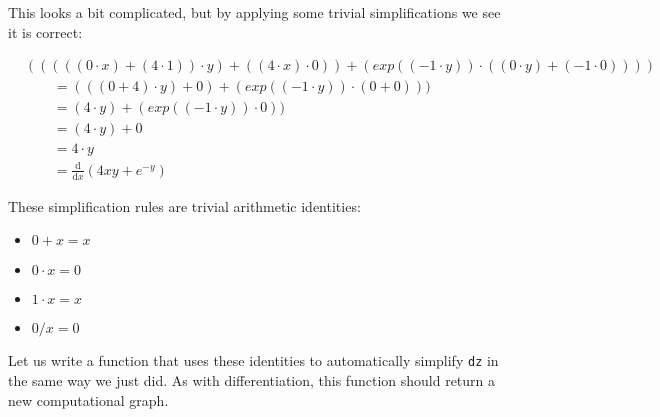 \documentclass[
  a4paper,
]{article}
\providecommand{\tightlist}{%
  \setlength{\itemsep}{0pt}\setlength{\parskip}{0pt}}
\begin{document}
This looks a bit complicated, but by applying some trivial
simplifications we see it is correct:

\begin{align*}
& ( ( ( ( ( 0 \cdot x ) + ( 4 \cdot 1 ) ) \cdot y ) + ( ( 4 \cdot x ) \cdot 0 ) ) + ( exp ( ( -1 \cdot y ) ) \cdot ( ( 0 \cdot y ) + ( -1 \cdot 0 ) ) ) )  \\
&\qquad= ( ( ( 0 + 4 ) \cdot y ) + 0 ) + ( exp ( ( -1 \cdot y ) ) \cdot ( 0 + 0 ) ) ) \\
&\qquad= ( 4 \cdot y ) + ( exp ( ( -1 \cdot y ) ) \cdot 0 ) ) \\
&\qquad= ( 4 \cdot y ) + 0 \\
&\qquad= 4 \cdot y \\
&\qquad= \frac{\text{d}}{\text{d}x} \left(4xy+e^{-y}\right)
\end{align*}

These simplification rules are trivial arithmetic identities:

\begin{itemize}
\tightlist
\item
  \(0+x=x\)
\item
  \(0\cdot x=0\)
\item
  \(1\cdot x=x\)
\item
  \(0/x=0\)
\end{itemize}

Let us write a function that uses these identities to automatically
simplify \texttt{dz} in the same way we just did. As with
differentiation, this function should return a new computational graph.
\end{document}
